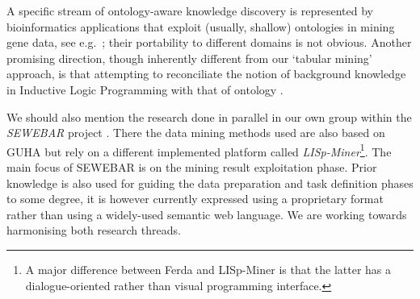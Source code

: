 A specific stream of ontology-aware knowledge discovery is represented by bioinformatics applications that exploit (usually, shallow) ontologies in mining gene data, see e.g.~\cite{Cannataro,Collard}; their portability to different domains is not obvious.
Another promising direction, though inherently different from our `tabular mining' approach, is that attempting to reconciliate the notion of background knowledge in Inductive Logic Programming with that of ontology \cite{Zakova}.

We should also mention the research done in parallel in our own group within the \emph{SEWEBAR} project \cite{SEWEBAR}.
There the data mining methods used are also based on GUHA but rely on a different implemented platform called \emph{LISp-Miner}\footnote{A major difference between Ferda and LISp-Miner is that the latter has a dialogue-oriented rather than visual programming interface.}.
The main focus of SEWEBAR is on the mining result exploitation phase.
Prior knowledge is also used for guiding the data preparation and task definition phases to some degree, it is however currently expressed using a proprietary format rather than using a widely-used semantic web language.
We are working towards harmonising both research threads.
